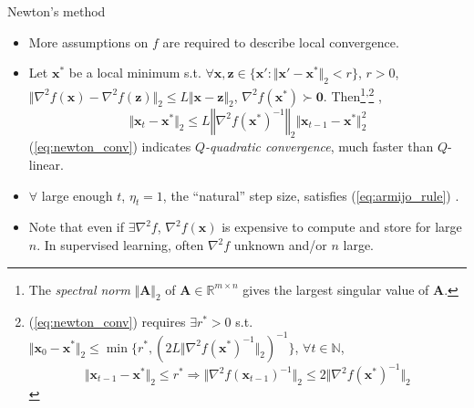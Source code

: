 \documentclass{beamer}
\numberwithin{equation}{section}
\newcommand{\aref}[1]{\alert{\ref{#1}}}
\begin{document}
\begin{frame}{Newton's method}
    \begin{itemize}
        \item
        More assumptions on $ f $ are required to describe local convergence.

        \item
        Let $ \mathbf{x}^* $ be a local minimum s.t. $ \forall \mathbf{x}, \mathbf{z} \in \{\mathbf{x}' : \Vert\mathbf{x}' - \mathbf{x}^*\Vert_2 < r\} $, $ r > 0 $, $ \Vert\nabla^2f(\mathbf{x}) - \nabla^2f(\mathbf{z})\Vert_2 \le L\Vert\mathbf{x} - \mathbf{z}\Vert_2 $, $ \nabla^2f(\mathbf{x}^*) \succ \mathbf{0} $. Then\footnote{
            The \textit{spectral norm} $ \Vert\mathbf{A}\Vert_2 $ of $ \mathbf{A} \in \mathbb{R}^{m \times n} $ gives the largest singular value of $ \mathbf{A} $.
        }\textsuperscript{,}\footnote{
            (\aref{eq:newton_conv}) requires $ \exists r^* > 0 $ s.t. $ \Vert\mathbf{x}_0  - \mathbf{x}^*\Vert_2 \le \min\big\{r^*, (2L\Vert\nabla^2f(\mathbf{x}^*)^{-1}\Vert_2)^{-1}\big\} $, $ \forall t \in \mathbb{N} $,
            \begin{equation*}
                \Vert\mathbf{x}_{t - 1} - \mathbf{x}^*\Vert_2 \le r^* \Rightarrow \big\Vert\nabla^2f(\mathbf{x}_{t - 1})^{-1}\big\Vert_2 \le 2\big\Vert\nabla^2f(\mathbf{x}^*)^{-1}\big\Vert_2
            \end{equation*}
            \vspace{-10 pt}
        } \cite{nocedal_opt},
        \begin{equation} \label{eq:newton_conv}
            \Vert\mathbf{x}_t - \mathbf{x}^*\Vert_2 \le L\left\Vert\nabla^2f(\mathbf{x}^*)^{-1}\right\Vert_2\Vert\mathbf{x}_{t - 1} - \mathbf{x}^*\Vert_2^2
        \end{equation}
        (\aref{eq:newton_conv}) indicates $ Q $\textit{-quadratic convergence}, much faster than $ Q $-linear.

        \item
        $ \forall $ large enough $ t $, $ \eta_t = 1 $, the ``natural'' step size, satisfies (\aref{eq:armijo_rule}) \cite{nocedal_opt}.

        \item
        Note that even if $ \exists \nabla^2 f $, $ \nabla^2f(\mathbf{x}) $ is expensive to compute and store for large $ n $. In supervised learning, often $ \nabla^2 f $ unknown and/or $ n $ large.
    \end{itemize}

    \medskip
\end{frame}
\end{document}
